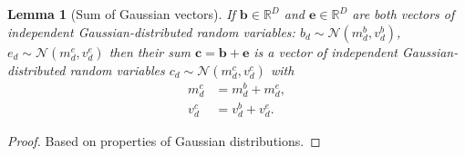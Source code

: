 \documentclass[letterpaper]{article}
\newtheorem{lemma}{Lemma}
\begin{document}
\begin{lemma}[Sum of Gaussian vectors]
\label{thm:sum_vectors}
If $\mathbf{b} \in \mathbb{R}^{D}$ and $\mathbf{e} \in \mathbb{R}^{D}$ are both vectors of independent Gaussian-distributed random variables: $b_{d} \sim \mathcal{N}(m^b_{d}, v^b_{d})$, $e_{d} \sim \mathcal{N}(m^e_{d}, v^e_{d})$ then their sum $\mathbf{c} = \mathbf{b} + \mathbf{e}$ is a vector of independent Gaussian-distributed random variables $c_{d} \sim \mathcal{N}(m^c_{d}, v^c_{d})$ with 
\begin{subequations}
\begin{align}
m^c_{d} &= m^b_{d} + m^e_{d}, \\
v^c_{d} &= v^b_{d} + v^e_{d}.
 \end{align}
\end{subequations}
\end{lemma}
\begin{proof}
Based on properties of Gaussian distributions.
\end{proof}
\end{document}
